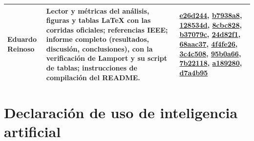 \documentclass[11pt,a4paper]{article}
\begin{document}
\begin{table}[htbp]
\begin{tabular}{@{}>{\raggedright\arraybackslash}p{2.3cm}>{\raggedright\arraybackslash}p{6.4cm}>{\raggedright\arraybackslash}p{6.1cm}@{}}
    Eduardo Reinoso & Lector y métricas del análisis, figuras y tablas LaTeX con las corridas
    oficiales; referencias IEEE; informe completo (resultados, discusión, conclusiones), con la
    verificación de Lamport y su script de tablas; instrucciones de compilación del README. & \href{https://github.com/yaser-uwu/GA-SUM-02-PE-U1/commit/e26d2441f28a39a7db63cd3142639fa8c134c358}{e26d244}, \href{https://github.com/yaser-uwu/GA-SUM-02-PE-U1/commit/b7938a8e37a8402fff5f9017fce398d946265215}{b7938a8}, \href{https://github.com/yaser-uwu/GA-SUM-02-PE-U1/commit/128534d580f772ed570dc0b08c8b53426ff9b6d7}{128534d}, \href{https://github.com/yaser-uwu/GA-SUM-02-PE-U1/commit/8cbc828023990e248c8a09cf2337334daadfa3f3}{8cbc828}, \href{https://github.com/yaser-uwu/GA-SUM-02-PE-U1/commit/b37079cf72c66e0f7891cea966fda4ecab44c361}{b37079c}, \href{https://github.com/yaser-uwu/GA-SUM-02-PE-U1/commit/24d82f148f15673e0d2c4f3ed4a7e0c9eb8e18cd}{24d82f1}, \href{https://github.com/yaser-uwu/GA-SUM-02-PE-U1/commit/68aac37c2b1ab5276c02e2be01df3454aa112eb5}{68aac37}, \href{https://github.com/yaser-uwu/GA-SUM-02-PE-U1/commit/4f4fe26a0c8116ae56f40d20a5070b0f03d88015}{4f4fe26}, \href{https://github.com/yaser-uwu/GA-SUM-02-PE-U1/commit/3c4c508e95a14a710625b4619500850cf370a4d8}{3c4c508}, \href{https://github.com/yaser-uwu/GA-SUM-02-PE-U1/commit/95b0a66fa062aaf65d97a2cb40fff8e5b742a2c6}{95b0a66}, \href{https://github.com/yaser-uwu/GA-SUM-02-PE-U1/commit/7b22118f86052d438f558aa862306fef43bcf1d4}{7b22118}, \href{https://github.com/yaser-uwu/GA-SUM-02-PE-U1/commit/a189280fd38ba7a47cb77c15e6cb6611b893a9fb}{a189280}, \href{https://github.com/yaser-uwu/GA-SUM-02-PE-U1/commit/d7a4b95dc44b18ad50baaf9c323485f888221609}{d7a4b95} \\
    \bottomrule
  \end{tabular}
\end{table}

\section{Declaración de uso de inteligencia artificial}
\end{document}

